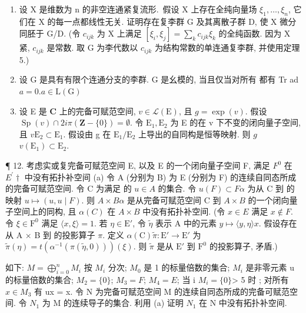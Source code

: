 \begin{enumerate}
\def\labelenumi{\arabic{enumi}.}
\setcounter{enumi}{8}
\item
  设 X 是维数为 n 的非空连通紧复流形.~假设 X 上存在全纯向量场 \(\xi_{1},\ldots,\xi_{n}\), 它们在 X 的每一点都线性无关. 证明存在复李群 G 及其离散子群 D, 使 X 微分同胚于 G/D. (令 \(c_{ijk}\) 为 X 上满足 \([\xi_{i},\xi_{j}]=\sum_{k}c_{ijk}\xi_{k}\) 的全纯函数. 因为 X 紧, \(c_{ijk}\) 是常数. 取 G 为李代数以 \(c_{ijk}\) 为结构常数的单连通复李群, 并使用定理 5.)
\item
  设 G 是具有有限个连通分支的李群. G 是幺模的, 当且仅当对所有  都有 Tr ad \(a = 0\).\(a \in \mathrm{L}(\mathrm{G})\)
\item
  设 E 是 \(\mathbf{C}\) 上的完备可赋范空间, \(v \in \mathcal{L}(\mathrm{E})\), 且 \(g = \exp(v)\). 假设 \(\operatorname{Sp}(v) \cap 2i\pi(\mathbf{Z} - \{0\}) = \emptyset\). 令 \(\mathrm{E}_1, \mathrm{E}_2\) 为 E 的在 v 下不变的闭向量子空间, 且 \(v\)\(\mathrm{E}_2 \subset \mathrm{E}_1\). 假设由 g 在 \(\mathrm{E}_1 / \mathrm{E}_2\) 上导出的自同构是恒等映射. 则 \(g\)\(v(\mathrm{E}_1) \subset \mathrm{E}_2\).
\end{enumerate}

¶ 12. 考虑实或复完备可赋范空间 E, 以及 E 的一个闭向量子空间 F, 满足 \(F^{0}\) 在 \(E^{\prime}\dagger\) 中没有拓扑补空间 (a) 令 A (分别为 B) 为 E (分别为 F) 的连续自同态所成的完备可赋范空间. 令 C 为满足  的 \(u \in A\) 的集合. 令 \(u(F) \subset F\)\(\alpha\) 为从 C 到  的映射 \(u \mapsto (u, u \mid F)\). 则 \(A \times B\)\(\alpha\) 是从完备可赋范空间 C 到 \(A \times B\) 的一个闭向量子空间上的同构, 且 \(\alpha(C)\) 在 \(A \times B\) 中没有拓扑补空间. (令 \(x \in E\) 满足 \(x \notin F\). 令 \(\xi \in \mathrm{F}^0\) 满足 \(\langle x, \xi \rangle = 1\). 若 \(\eta \in \mathrm{E}'\), 令 \(\tilde{\eta}\) 表示 A 中的元素 \(y \mapsto \langle y, \eta \rangle x\). 假设存在从 A × B 到  的投影算子 \(\pi\). 定义 \(\alpha(\mathrm{C})\)\(\tilde{\pi} \colon \mathrm{E}' \to \mathrm{E}'\) 为 \(\tilde{\pi}(\eta) = t(\alpha^{-1}(\pi(\tilde{\eta}, 0)))(\xi)\). 则 \(\tilde{\pi}\) 是从 \(\mathrm{E}'\) 到 \(\mathrm{F}^0\) 的投影算子, 矛盾.)

如下: \(M = \bigoplus_{i=0}^{n} M_{i}\) 按 \(M_{i}\) 分次; \(M_{0}\) 是 1 的标量倍数的集合; \(M_{i}\) 是非零元素 u 的标量倍数的集合; \(M_{2} = \{0\}\); \(M_{3} = F\); \(M_{4} = E\); 当 i \(M_{i} = \{0\}\)\textgreater{} 5 时 ; 对所有 \(x \in M_{3}\) 有 ux = x. 令 N 为完备可赋范空间 M 的连续自同态所成的完备可赋范空间. 令 \(N_{1}\) 为 M 的连续导子的集合. 利用 (a) 证明 \(N_{1}\) 在 N 中没有拓扑补空间.

